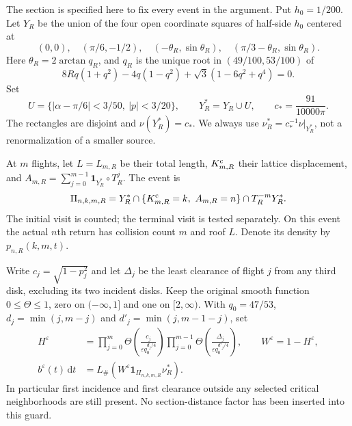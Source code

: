 \documentclass[11pt,reqno]{amsart}
\numberwithin{equation}{section}
\theoremstyle{definition}\newtheorem{definition}[theorem]{Definition}
\theoremstyle{remark}\newtheorem{remark}[theorem]{Remark}
\newcommand{\dd}{\,\mathrm d}\newcommand{\one}{\mathbf1}
\theoremstyle{definition}\newtheorem{inputstatement}[theorem]{Input statement}
\begin{document}
The section is specified here to fix every event in the argument.
Put $h_0=1/200$. Let $Y_R$ be the union of the four open coordinate
squares of half-side $h_0$ centered at
\[
 (0,0),\quad(\pi/6,-1/2),\quad
 (-\theta_R,\sin\theta_R),\quad
 (\pi/3-\theta_R,\sin\theta_R).
\]
Here $\theta_R=2\arctan q_R$, and $q_R$ is the unique root in
$(49/100,53/100)$ of
\[
 8Rq(1+q^2)-4q(1-q^2)+\sqrt3(1-6q^2+q^4)=0.
\]
Set
\[
 U=\{|\alpha-\pi/6|<3/50,\ |p|<3/20\},\qquad
 Y_R^*=Y_R\cup U,\qquad c_*=\frac{91}{10000\pi}.
\]
The rectangles are disjoint and $\nu(Y_R^*)=c_*$. We always use
$\nu_R^*=c_*^{-1}\nu|_{Y_R^*}$, not a renormalization of a smaller
source.

At $m$ flights, let $L=L_{m,R}$ be their total length,
$K^{\rm c}_{m,R}$ their lattice displacement, and
$A_{m,R}=\sum_{j=0}^{m-1}\one_{Y_R^*}\circ T_R^j$. The event is
\begin{equation}\label{eq:v76-event}
 \Pi_{n,k,m,R}=Y_R^*\cap\{K^{\rm c}_{m,R}=k,\ A_{m,R}=n\}
                         \cap T_R^{-m}Y_R^*.
\end{equation}
The initial visit is counted; the terminal visit is tested separately.
On this event the actual $n$th return has collision count $m$ and
roof $L$. Denote its density by $p_{n,R}(k,m,t)$.

Write $c_j=\sqrt{1-p_j^2}$ and let $\Delta_j$ be the least clearance
of flight $j$ from any third disk, excluding its two incident disks.
Keep the original smooth function $0\le\Theta\le1$, zero on
$(-\infty,1]$ and one on $[2,\infty)$. With $q_0=47/53$,
$d_j=\min(j,m-j)$ and $d'_j=\min(j,m-1-j)$, set
\begin{align}
 H^\varepsilon&=
 \prod_{j=0}^{m}\Theta\!\left(\frac{c_j}{\varepsilon q_0^{d_j/4}}\right)
 \prod_{j=0}^{m-1}\Theta\!\left(\frac{\Delta_j}{\varepsilon q_0^{d'_j/4}}\right),
 \qquad W^\varepsilon=1-H^\varepsilon,\label{eq:v76-guard}\\
 b^\varepsilon(t)\dd t
   &=L_\#(W^\varepsilon\one_{\Pi_{n,k,m,R}}\nu_R^*).
 \label{eq:v76-source}
\end{align}
In particular first incidence and first clearance outside any selected
critical neighborhoods are still present. No section-distance factor
has been inserted into this guard.
\end{document}

